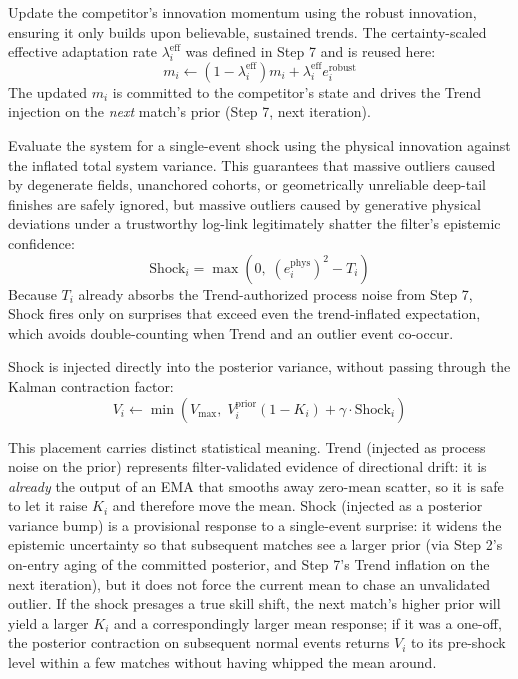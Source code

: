 \documentclass[12pt]{article}
\newcommand{\gammad}{\gamma}    %
\newcommand{\ephys}{e_i^{\mathrm{phys}}}
\newcommand{\erobust}{e_i^{\mathrm{robust}}}
\begin{document}
	Update the competitor's innovation momentum using the robust innovation, ensuring it only builds upon believable, sustained trends. The certainty-scaled effective adaptation rate $\lambda_i^{\mathrm{eff}}$ was defined in Step 7 and is reused here:
	\begin{equation}
		m_i \leftarrow (1 - \lambda_i^{\mathrm{eff}}) m_i + \lambda_i^{\mathrm{eff}} \erobust
	\end{equation}
	The updated $m_i$ is committed to the competitor's state and drives the Trend injection on the \emph{next} match's prior (Step 7, next iteration).

	Evaluate the system for a single-event shock using the physical innovation against the inflated total system variance. This guarantees that massive outliers caused by degenerate fields, unanchored cohorts, or geometrically unreliable deep-tail finishes are safely ignored, but massive outliers caused by generative physical deviations under a trustworthy log-link legitimately shatter the filter's epistemic confidence:
	\begin{equation}
		\text{Shock}_i = \max\!\left(0,\; (\ephys)^2 - T_i\right)
	\end{equation}
	Because $T_i$ already absorbs the Trend-authorized process noise from Step 7, Shock fires only on surprises that exceed even the trend-inflated expectation, which avoids double-counting when Trend and an outlier event co-occur.

	Shock is injected directly into the posterior variance, without passing through the Kalman contraction factor:
	\begin{equation}
		V_i \leftarrow \min\!\left(V_{\max},\; V_i^{\mathrm{prior}}(1 - K_i) + \gammad \cdot \text{Shock}_i\right)
	\end{equation}

	This placement carries distinct statistical meaning. Trend (injected as process noise on the prior) represents filter-validated evidence of directional drift: it is \emph{already} the output of an EMA that smooths away zero-mean scatter, so it is safe to let it raise $K_i$ and therefore move the mean. Shock (injected as a posterior variance bump) is a provisional response to a single-event surprise: it widens the epistemic uncertainty so that subsequent matches see a larger prior (via Step 2's on-entry aging of the committed posterior, and Step 7's Trend inflation on the next iteration), but it does not force the current mean to chase an unvalidated outlier. If the shock presages a true skill shift, the next match's higher prior will yield a larger $K_i$ and a correspondingly larger mean response; if it was a one-off, the posterior contraction on subsequent normal events returns $V_i$ to its pre-shock level within a few matches without having whipped the mean around.
\end{document}
